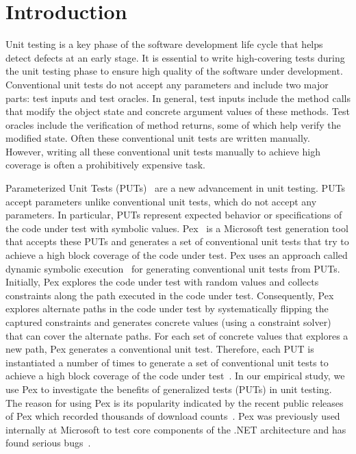 \section{Introduction}
\label{sec:intro}
Unit testing is a key phase of the software development life cycle that
helps detect defects at an early stage. It is essential to write high-covering tests during the unit testing phase to ensure high quality of the software under development. Conventional unit tests do not
accept any parameters and include two major parts: test inputs and test oracles. 
In general, test inputs include the method calls that modify the 
object state and concrete argument values of these methods. Test oracles include the verification of method returns, some of which help verify the modified state. Often these conventional unit tests are written manually. However, writing all these conventional unit tests manually to achieve high coverage is
often a prohibitively expensive task.

Parameterized Unit Tests (PUTs)~\cite{tillmann05:parameterized} are a new advancement in unit testing. PUTs
accept parameters unlike conventional unit tests, which do not accept
any parameters. In particular, PUTs represent expected behavior or
specifications of the code under test with symbolic values. 
Pex~\cite{tillmann08:pex, pex:rel} is a Microsoft test generation tool that accepts these PUTs
and generates a set of conventional unit tests that try to
achieve a high block coverage of the code under test. Pex uses an approach called dynamic symbolic execution~\cite{king:symex, godefroid05:dart, sen07:cute}
for generating conventional unit tests from PUTs.
Initially, Pex explores the code under test with random values
and collects constraints along the path executed in the code under test. 
Consequently, Pex explores alternate paths in the code under test by systematically flipping the captured constraints and generates concrete values (using a constraint solver) that can cover the alternate paths.
For each set of concrete values that explores a new path, Pex generates a conventional unit test. Therefore, each PUT is instantiated a number of times to generate a set of conventional unit tests to achieve a high block coverage of the code under test~\cite{tillmann06:unit}. In our empirical study, we use Pex to investigate the benefits of generalized tests (PUTs) in unit testing. The reason for using Pex is its popularity indicated by the recent public releases of Pex which recorded thousands of download counts~\cite{pex:rel}. Pex was previously used internally at Microsoft to test core components
of the .NET architecture and has found serious
bugs~\cite{tillmann08:pex}.

